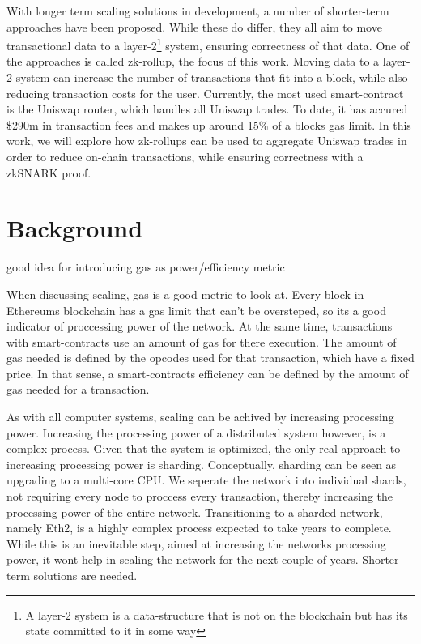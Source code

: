 \documentclass[11pt,twoside,a4paper,final]{book}
\begin{document}
With longer term scaling solutions in development, a number of shorter-term approaches have been proposed. While these do differ, they all aim to move transactional data to a layer-2\footnote{A layer-2 system is a data-structure that is not on the blockchain but has its state committed to it in some way} system, ensuring correctness of that data. One of the approaches is called zk-rollup, the focus of this work. Moving data to a layer-2 system can increase the number of transactions that fit into a block, while also reducing transaction costs for the user. Currently, the most used smart-contract is the Uniswap router, which handles all Uniswap trades. To date, it has accured \$290m in transaction fees and makes up around 15\% of a blocks gas limit. In this work, we will explore how zk-rollups can be used to aggregate Uniswap trades in order to reduce on-chain transactions, while ensuring correctness with a zkSNARK proof. 






\section{Background}
good idea for introducing gas as power/efficiency metric

When discussing scaling, gas is a good metric to look at. Every block in Ethereums blockchain has a gas limit that can't be oversteped,  so its a good indicator of proccessing power of the network. At the same time, transactions with smart-contracts use an amount of gas for there execution. The amount of gas needed is defined by the opcodes used for that transaction, which have a fixed price. In that sense, a smart-contracts efficiency can be defined by the amount of gas needed for a transaction. 

As with all computer systems, scaling can be achived by increasing processing power. Increasing the processing power of a distributed system however, is a complex process. Given that the system is optimized, the only real approach to increasing processing power is sharding. Conceptually, sharding can be seen as upgrading to a multi-core CPU. We seperate the network into individual shards, not requiring every node to proccess every transaction, thereby increasing the processing power of the entire network. Transitioning to a sharded network, namely Eth2, is a highly complex process expected to take years to complete. While this is an inevitable step, aimed at increasing the networks processing power, it wont help in scaling the network for the next couple of years. Shorter term solutions are needed. 
\end{document}
